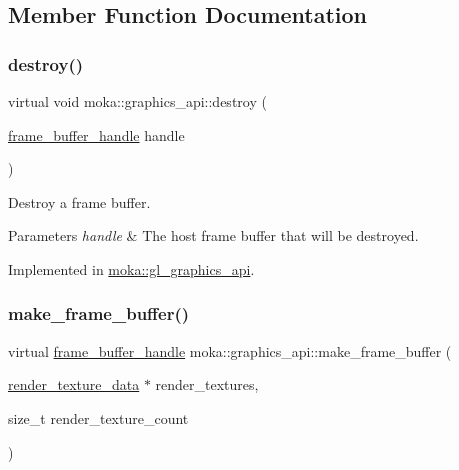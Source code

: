 \subsection{Member Function Documentation}
\mbox{\label{classmoka_1_1graphics__api_a493d46d804ed3dcbe6e9b8bd20d5bb6f}} 
\subsubsection{\texorpdfstring{destroy()}{destroy()}}
{\footnotesize\ttfamily virtual void moka\+::graphics\+\_\+api\+::destroy (\begin{DoxyParamCaption}\item[{\mbox{\hyperlink{structmoka_1_1frame__buffer__handle}{frame\+\_\+buffer\+\_\+handle}}}]{handle }\end{DoxyParamCaption})\hspace{0.3cm}{\ttfamily [pure virtual]}}



Destroy a frame buffer. 


\begin{DoxyParams}{Parameters}
{\em handle} & The host frame buffer that will be destroyed. \\
\hline
\end{DoxyParams}


Implemented in \mbox{\hyperlink{classmoka_1_1gl__graphics__api_afb8615d57b729debc7c204463c492f5f}{moka\+::gl\+\_\+graphics\+\_\+api}}.

\mbox{\label{classmoka_1_1graphics__api_ac697780264c97703191fac805198be1e}} 
\subsubsection{\texorpdfstring{make\_frame\_buffer()}{make\_frame\_buffer()}}
{\footnotesize\ttfamily virtual \mbox{\hyperlink{structmoka_1_1frame__buffer__handle}{frame\+\_\+buffer\+\_\+handle}} moka\+::graphics\+\_\+api\+::make\+\_\+frame\+\_\+buffer (\begin{DoxyParamCaption}\item[{\mbox{\hyperlink{structmoka_1_1render__texture__data}{render\+\_\+texture\+\_\+data}} $\ast$}]{render\+\_\+textures,  }\item[{size\+\_\+t}]{render\+\_\+texture\+\_\+count }\end{DoxyParamCaption})\hspace{0.3cm}{\ttfamily [pure virtual]}}



